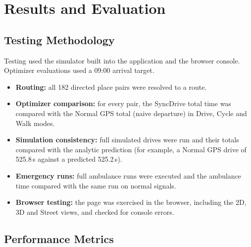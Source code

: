 \documentclass[12pt,a4paper]{report}
\begin{document}
\chapter{Results and Evaluation}

\section{Testing Methodology}

Testing used the simulator built into the application and the browser console.
Optimizer evaluations used a 09:00 arrival target.

\begin{itemize}
  \item \textbf{Routing:} all 182 directed place pairs were resolved to a route.
  \item \textbf{Optimizer comparison:} for every pair, the SyncDrive total time
        was compared with the Normal GPS total (naive departure) in Drive,
        Cycle and Walk modes.
  \item \textbf{Simulation consistency:} full simulated drives were run and
        their totals compared with the analytic prediction (for example, a
        Normal GPS drive of 525.8\,s against a predicted 525.2\,s).
  \item \textbf{Emergency runs:} full ambulance runs were executed and the
        ambulance time compared with the same run on normal signals.
  \item \textbf{Browser testing:} the page was exercised in the browser,
        including the 2D, 3D and Street views, and checked for console errors.
\end{itemize}

\section{Performance Metrics}
\end{document}
